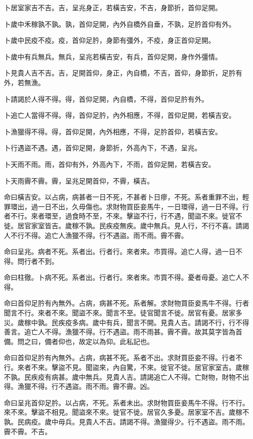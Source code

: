 卜居室家吉不吉。吉，呈兆身正，若橫吉安，不吉，身節折，首仰足開。

卜歲中禾稼孰不孰。孰，首仰足開，內外自橋外自垂，不孰，足肣首仰有外。

卜歲中民疫不疫。疫，首仰足肣，身節有彊外，不疫，身正首仰足開。

卜歲中有兵無兵。無兵，呈兆若橫吉安，有兵，首仰足開，身作外彊情。

卜見貴人吉不吉。吉，足開首仰，身正，內自橋，不吉，首仰，身節折，足肣有外，若無漁。

卜請謁於人得不得。得，首仰足開，內自橋，不得，首仰足肣有外。

卜追亡人當得不得。得，首仰足肣，內外相應，不得，首仰足開，若橫吉安。

卜漁獵得不得。得，首仰足開，內外相應，不得，足肣首仰，若橫吉安。

卜行遇盜不遇。遇，首仰足開，身節折，外高內下，不遇，呈兆。

卜天雨不雨。雨，首仰有外，外高內下，不雨，首仰足開，若橫吉安。

卜天雨霽不霽。霽，呈兆足開首仰，不霽，橫吉。

命曰橫吉安。以占病，病甚者一日不死，不甚者卜日瘳，不死。系者重罪不出，輕罪環出，過一日不出，久毋傷也。求財物買臣妾馬牛，一日環得，過一日不得。行者不行。來者環至，過食時不至，不來。擊盜不行，行不遇，聞盜不來。徙官不徙。居官家室皆吉。歲稼不孰。民疾疫無疾。歲中無兵。見人行，不行不喜。請謁人不行不得。追亡人漁獵不得。行不遇盜。雨不雨。霽不霽。

命曰呈兆。病者不死。系者出。行者行。來者來。市買得。追亡人得，過一日不得。問行者不到。

命曰柱徹。卜病不死。系者出。行者行。來者來。市買不得。憂者毋憂。追亡人不得。

命曰首仰足肣有內無外。占病，病甚不死。系者解。求財物買臣妾馬牛不得。行者聞言不行。來者不來。聞盜不來。聞言不至。徒官聞言不徙。居官有憂。居家多災。歲稼中孰。民疾疫多病。歲中有兵，聞言不開。見貴人吉。請謁不行，行不得善言。追亡人不得。漁獵不得。行不遇盜。雨不雨甚。霽不霽。故其莫字皆為首備。問之曰，備者仰也，故定以為仰。此私記也。

命曰首仰足肣有內無外。占病，病甚不死。系者不出。求財買臣妾不得。行者不行。來者不來。擊盜不見。聞盜來，內自驚，不來。徙官不徙。居官家室吉。歲稼不孰。民疾疫有病甚。歲中無兵。見貴人吉。請謁追亡人不得。亡財物，財物不出得。漁獵不得。行不遇盜。雨不雨。霽不霽。凶。

命曰呈兆首仰足肣。以占病，不死。系者未出。求財物買臣妾馬牛不得。行不行。來不來。擊盜不相見。聞盜來不來。徙官不徙。居官久多憂。居家室不吉。歲稼不孰。民病疫。歲中毋兵。見貴人不吉。請謁不得。漁獵得少。行不遇盜。雨不雨。霽不霽。不吉。

